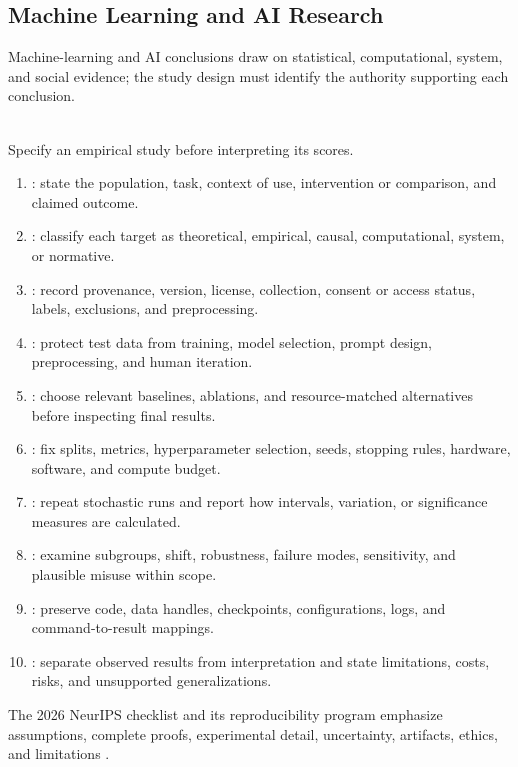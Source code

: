 \subsection{Machine Learning and AI Research}

Machine-learning and AI conclusions draw on statistical, computational, system, and social evidence; the study design must identify the authority supporting each conclusion.

\begin{process} \label{proc:ml-ai-study-protocol} \\
Specify an empirical study before interpreting its scores.
\begin{enumerate}[label=(\roman*)]
\setlength{\itemsep}{0pt}
\item {}: state the population, task, context of use, intervention or comparison, and claimed outcome.
\item {}: classify each target as theoretical, empirical, causal, computational, system, or normative.
\item {}: record provenance, version, license, collection, consent or access status, labels, exclusions, and preprocessing.
\item {}: protect test data from training, model selection, prompt design, preprocessing, and human iteration.
\item {}: choose relevant baselines, ablations, and resource-matched alternatives before inspecting final results.
\item {}: fix splits, metrics, hyperparameter selection, seeds, stopping rules, hardware, software, and compute budget.
\item {}: repeat stochastic runs and report how intervals, variation, or significance measures are calculated.
\item {}: examine subgroups, shift, robustness, failure modes, sensitivity, and plausible misuse within scope.
\item {}: preserve code, data handles, checkpoints, configurations, logs, and command-to-result mappings.
\item {}: separate observed results from interpretation and state limitations, costs, risks, and unsupported generalizations.
\end{enumerate}
The 2026 NeurIPS checklist and its reproducibility program emphasize assumptions, complete proofs, experimental detail, uncertainty, artifacts, ethics, and limitations \citep{neurips2026checklist,pineau2021reproducibility}.
\end{process}

